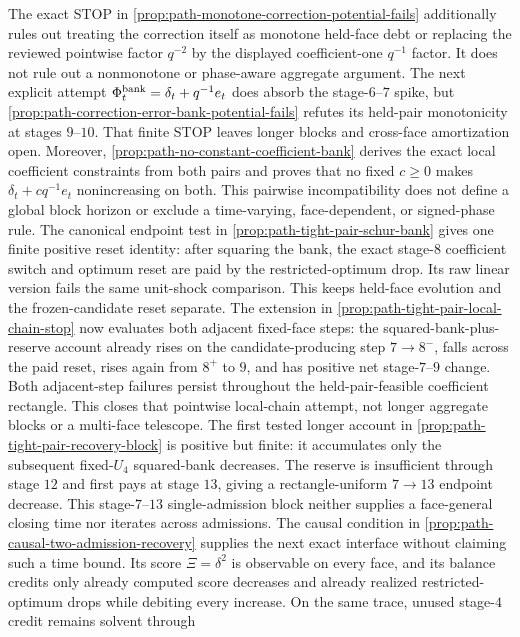 The exact STOP in
\cref{prop:path-monotone-correction-potential-fails} additionally rules out
treating the correction itself as monotone held-face debt or replacing the
reviewed pointwise factor $q^{-2}$ by the displayed coefficient-one
$q^{-1}$ factor.  It does not rule out a nonmonotone or phase-aware aggregate
argument.  The next explicit attempt
$\Phi_t^{\rm bank}=\delta_t+q^{-1}e_t$ does absorb the stage-$6$--$7$ spike,
but \cref{prop:path-correction-error-bank-potential-fails} refutes its
held-pair monotonicity at stages $9$--$10$.  That finite STOP leaves longer
blocks and cross-face amortization open.  Moreover,
\cref{prop:path-no-constant-coefficient-bank} derives the exact local
coefficient constraints from both pairs and proves that no fixed
$c\geq0$ makes $\delta_t+cq^{-1}e_t$ nonincreasing on both.  This pairwise
incompatibility does not define a global block horizon or exclude a
time-varying, face-dependent, or signed-phase rule.  The canonical endpoint
test in \cref{prop:path-tight-pair-schur-bank} gives one finite positive
reset identity: after squaring the bank, the exact stage-$8$ coefficient
switch and optimum reset are paid by the restricted-optimum drop.  Its raw
linear version fails the same unit-shock comparison.  This keeps held-face
evolution and the frozen-candidate reset separate.  The extension in
\cref{prop:path-tight-pair-local-chain-stop} now evaluates both adjacent
fixed-face steps: the squared-bank-plus-reserve account already rises on the
candidate-producing step $7\to8^-$, falls across the paid reset, rises again
from $8^+$ to $9$, and has positive net stage-$7$--$9$ change.  Both
adjacent-step failures persist throughout the held-pair-feasible coefficient
rectangle.  This closes that pointwise local-chain attempt, not longer
aggregate blocks or a multi-face telescope.  The first tested longer account
in \cref{prop:path-tight-pair-recovery-block} is positive but finite: it
accumulates only the subsequent fixed-$U_4$ squared-bank decreases.  The
reserve is insufficient through stage $12$ and first pays at stage $13$,
giving a rectangle-uniform $7\to13$ endpoint decrease.  This stage-$7$--$13$
single-admission block neither supplies a face-general closing time nor
iterates across admissions.
The causal condition in
\cref{prop:path-causal-two-admission-recovery} supplies the next exact
interface without claiming such a time bound.  Its score $\Xi=\delta^2$ is
observable on every face, and its balance credits only already computed score
decreases and already realized restricted-optimum drops while debiting every
increase.  On the same trace, unused stage-$4$ credit remains solvent through

